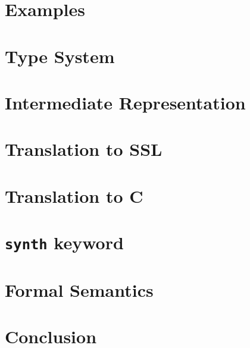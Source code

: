 \documentclass[runningheads]{llncs}
\begin{document}
\section{Examples}
\label{sec:examples}


\section{Type System}
\label{sec:types}

\section{Intermediate Representation}
\label{sec:IR}

\section{Translation to SSL}
\label{sec:to-ssl}

\section{Translation to C}
\label{sec:to-c}

\section{\texttt{synth} keyword}
\label{sec:synth}

\section{Formal Semantics}
\label{sec:semantics}

\section{Conclusion}
\label{sec:conclusion}

% 
% 
% 
% 
% 
% 
% 



\end{document}
